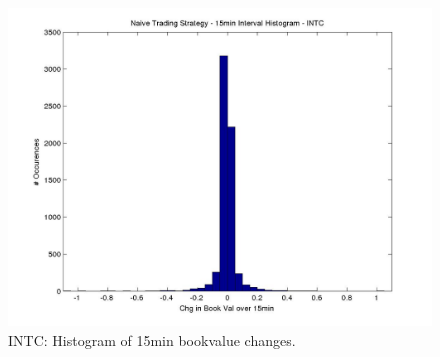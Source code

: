 \begin{figure}
  \includegraphics[width=\textwidth]{Figs/fig-INTC-15min-hist}
  \caption{INTC: Histogram of 15min bookvalue changes.}
\end{figure}

